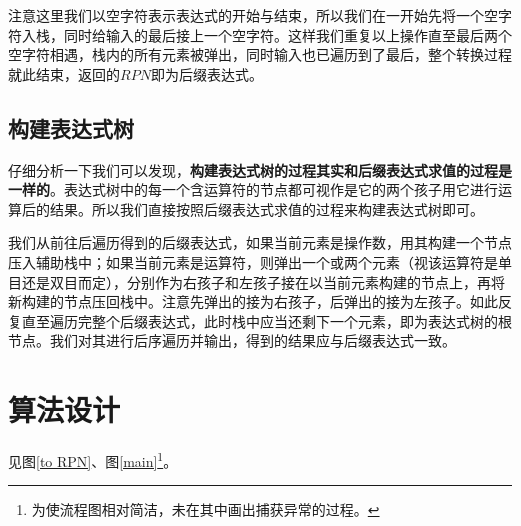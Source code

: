 \documentclass[UTF8]{ctexart}
\begin{document}
		\indent 注意这里我们以空字符表示表达式的开始与结束，所以我们在一开始先将一个空字符入栈，同时给输入的最后接上一个空字符。这样我们重复以上操作直至最后两个空字符相遇，栈内的所有元素被弹出，同时输入也已遍历到了最后，整个转换过程就此结束，返回的$RPN$即为后缀表达式。
		
		\subsection{构建表达式树}\label{con tree}
		\indent 仔细分析一下我们可以发现，\textbf{构建表达式树的过程其实和后缀表达式求值的过程是一样的}。表达式树中的每一个含运算符的节点都可视作是它的两个孩子用它进行运算后的结果。所以我们直接按照后缀表达式求值的过程来构建表达式树即可。
		
		\indent 我们从前往后遍历得到的后缀表达式，如果当前元素是操作数，用其构建一个节点压入辅助栈中；如果当前元素是运算符，则弹出一个或两个元素（视该运算符是单目还是双目而定），分别作为右孩子和左孩子接在以当前元素构建的节点上，再将新构建的节点压回栈中。注意先弹出的接为右孩子，后弹出的接为左孩子。如此反复直至遍历完整个后缀表达式，此时栈中应当还剩下一个元素，即为表达式树的根节点。我们对其进行后序遍历并输出，得到的结果应与后缀表达式一致。
		
		
	
	\section{算法设计}
	见图\ref{to RPN}、图\ref{main}\footnote{为使流程图相对简洁，未在其中画出捕获异常的过程。}。
\end{document}

